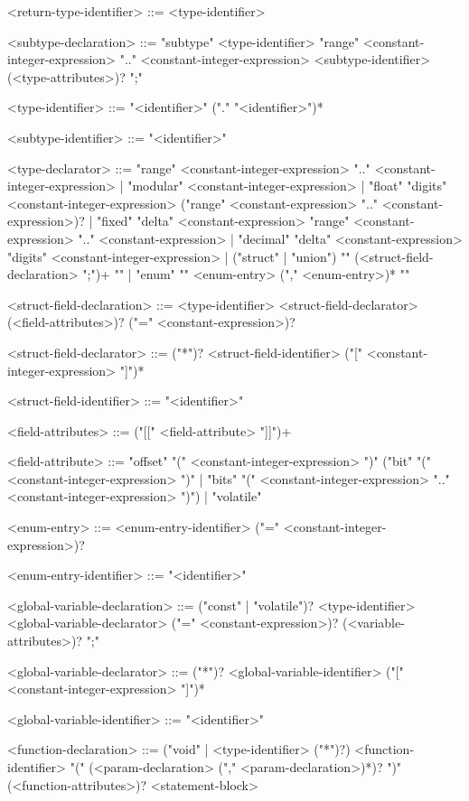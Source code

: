 \documentclass[11pt,letterpaper,twoside,openany]{book}
\begin{document}
\begin{grammar}
<return-type-identifier> ::= <type-identifier>

<subtype-declaration> ::=
   "subtype" <type-identifier> "range" <constant-integer-expression>
      ".." <constant-integer-expression> <subtype-identifier>
      (<type-attributes>)? ";"

<type-identifier> ::= "<identifier>" ("." "<identifier>")*

<subtype-identifier> ::= "<identifier>"

<type-declarator> ::=
   "range" <constant-integer-expression> ".." <constant-integer-expression> |
   "modular" <constant-integer-expression> |
   "float" "digits" <constant-integer-expression>
      ("range" <constant-expression> ".." <constant-expression>)? |
   "fixed" "delta" <constant-expression> "range"
      <constant-expression> ".." <constant-expression> |
   "decimal" "delta" <constant-expression> "digits" <constant-integer-expression> |
   ("struct" | "union") "{" (<struct-field-declaration> ";")+ "}" |
   "enum" "{" <enum-entry> ("," <enum-entry>)* "}"

<struct-field-declaration> ::=
   <type-identifier> <struct-field-declarator>
      (<field-attributes>)? ("=" <constant-expression>)?

<struct-field-declarator> ::=
   ("*")? <struct-field-identifier>
            ("[" <constant-integer-expression> "]")*

<struct-field-identifier> ::= "<identifier>"

<field-attributes> ::=
   ("[[" <field-attribute> "]]")+

<field-attribute> ::=
   "offset" "(" <constant-integer-expression> ")"
      ("bit" "(" <constant-integer-expression> ")" |
       "bits" "(" <constant-integer-expression> ".." <constant-integer-expression> ")") |
   "volatile"

<enum-entry> ::=
   <enum-entry-identifier> ("=" <constant-integer-expression>)?

<enum-entry-identifier> ::= "<identifier>"

<global-variable-declaration> ::=
   ("const" | "volatile")? <type-identifier> <global-variable-declarator>
   ("=" <constant-expression>)? (<variable-attributes>)? ";"

<global-variable-declarator> ::=
   ("*")? <global-variable-identifier>
            ("[" <constant-integer-expression> "]")*

<global-variable-identifier> ::= "<identifier>"

<function-declaration> ::=
   ("void" | <type-identifier> ("*")?) <function-identifier>
       "(" (<param-declaration> ("," <param-declaration>)*)? ")"
       (<function-attributes>)?
       <statement-block>


\end{grammar}
\end{document}
